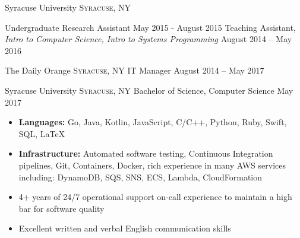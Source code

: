 \documentclass[10pt,a4paper]{article}
\begin{document}
\headedsection  %
  {Syracuse University}
  {\textsc{Syracuse, NY}} {%
  \headedsubsection
    {Undergraduate Research Assistant}
    {May 2015 - August 2015}
    {}
    \headedsubsection
    {Teaching Assistant, \it{Intro to Computer Science, Intro to Systems Programming}}
    {August 2014 -- May 2016}
{}

}

\headedsection  %
  {The Daily Orange}
  {\textsc{Syracuse, NY}} {%
  \headedsubsection
    {IT Manager}
    {August 2014 -- May 2017}
    {}
}

\spacedhrule{0.9em}{-0.4em}


\headedsection
  {Syracuse University}
  {\textsc{Syracuse, NY}} {%
  \headedsubsection
    {Bachelor of Science, Computer Science}
    {May 2017}
{}
}

\spacedhrule{0.9em}{-0.4em}


\begin{itemize}
\item 
  \textbf{Languages:}
  {Go, Java, Kotlin, JavaScript, C/C++, Python, Ruby, Swift, SQL, \LaTeX}

\item
  \textbf{Infrastructure:}
  {Automated software testing, Continuous Integration pipelines, Git, Containers, Docker,  rich experience in many AWS services including: DynamoDB, SQS, SNS, ECS, Lambda, CloudFormation }

\item 4+ years of 24/7 operational support on-call experience to maintain a high bar for software quality
\item Excellent written and verbal English communication skills
\end{itemize}
\end{document}
